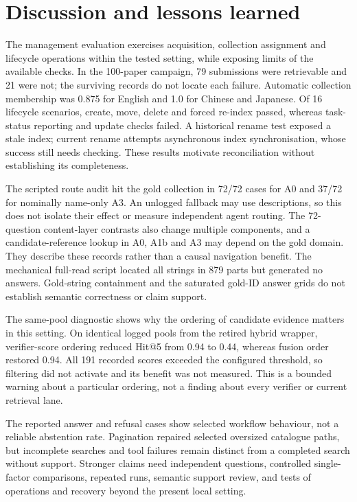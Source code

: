 \section{Discussion and lessons learned}
\label{sec:discussion}

The management evaluation exercises acquisition, collection assignment and
lifecycle operations within the tested setting, while exposing limits of the
available checks. In the
100-paper campaign, 79 submissions were retrievable and 21 were not; the
surviving records do not locate each failure. Automatic collection membership
was 0.875 for English and 1.0 for Chinese and Japanese. Of 16 lifecycle
scenarios, create, move, delete and forced re-index passed, whereas task-status
reporting and update checks failed. A historical rename test exposed a stale
index; current rename attempts asynchronous index synchronisation, whose
success still needs checking. These results motivate reconciliation without
establishing its completeness.

The scripted route audit hit the gold collection in 72/72 cases for A0 and
37/72 for nominally name-only A3. An unlogged fallback may use descriptions,
so this does not isolate their effect or measure independent agent routing.
The 72-question content-layer contrasts also change multiple components, and a
candidate-reference lookup in A0, A1b and A3 may depend on the gold domain.
They describe these records rather than a causal navigation benefit. The
mechanical full-read script located all strings in 879 parts but generated no
answers. Gold-string containment and the saturated gold-ID answer grids do not
establish semantic correctness or claim support.

The same-pool diagnostic shows why the ordering of candidate
evidence matters in this setting. On identical logged pools from the retired
hybrid wrapper, verifier-score ordering reduced Hit@5
from 0.94 to 0.44, whereas fusion order restored 0.94. All 191 recorded scores
exceeded the configured threshold, so filtering did not activate and its
benefit was not measured. This is a bounded warning about a particular
ordering, not a finding about every verifier or current retrieval lane.

The reported answer and refusal cases show selected workflow behaviour, not a
reliable abstention rate. Pagination repaired selected oversized catalogue
paths, but incomplete searches and tool failures remain distinct from a
completed search without support. Stronger claims need independent questions,
controlled single-factor comparisons, repeated runs, semantic support review,
and tests of operations and recovery beyond the present local setting.
